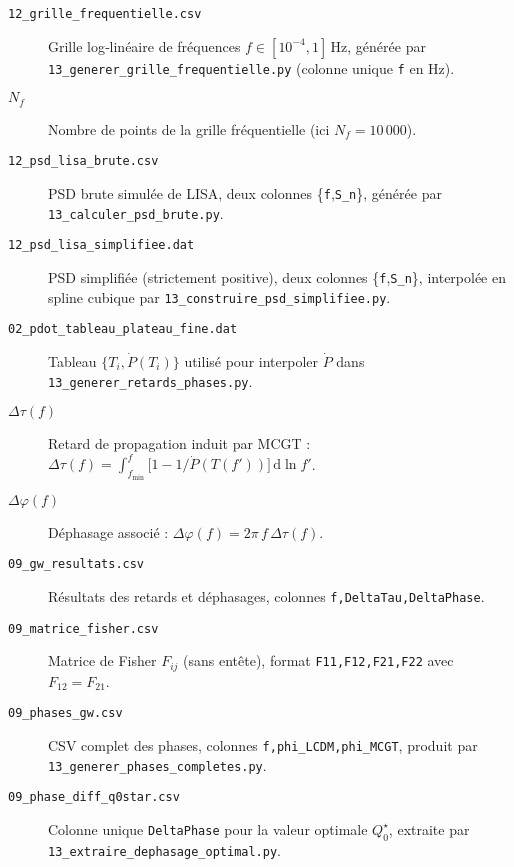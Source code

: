 \begin{description}
  \item[\texttt{12\_grille\_frequentielle.csv}]  
    Grille log‐linéaire de fréquences $f\in[10^{-4},1]\,$Hz, générée par \texttt{13\_generer\_grille\_frequentielle.py} (colonne unique \texttt{f} en Hz).

  \item[$N_{f}$]  
    Nombre de points de la grille fréquentielle (ici $N_{f}=10\,000$).

  \item[\texttt{12\_psd\_lisa\_brute.csv}]  
    PSD brute simulée de LISA, deux colonnes \{\texttt{f},\texttt{S\_n}\}, générée par \texttt{13\_calculer\_psd\_brute.py}.

  \item[\texttt{12\_psd\_lisa\_simplifiee.dat}]  
    PSD simplifiée (strictement positive), deux colonnes \{\texttt{f},\texttt{S\_n}\}, interpolée en spline cubique par \texttt{13\_construire\_psd\_simplifiee.py}.

  \item[\texttt{02\_pdot\_tableau\_plateau\_fine.dat}]  
    Tableau $\{T_i,\dot P(T_i)\}$ utilisé pour interpoler $\dot P$ dans \texttt{13\_generer\_retards\_phases.py}.

  \item[$\Delta\tau(f)$]  
    Retard de propagation induit par MCGT :  
    $\displaystyle \Delta\tau(f)
      =\int_{f_{\min}}^{f}\bigl[1 - 1/\dot P(T(f'))\bigr]\,\mathrm{d}\ln f'$.

  \item[$\Delta\varphi(f)$]  
    Déphasage associé :  
    $\Delta\varphi(f)=2\pi\,f\,\Delta\tau(f)$.

  \item[\texttt{09\_gw\_resultats.csv}]  
    Résultats des retards et déphasages, colonnes \texttt{f,DeltaTau,DeltaPhase}.

  \item[\texttt{09\_matrice\_fisher.csv}]  
    Matrice de Fisher $F_{ij}$ (sans entête), format  
    \texttt{F11,F12,F21,F22} avec $F_{12}=F_{21}$.

  \item[\texttt{09\_phases\_gw.csv}]  
    CSV complet des phases, colonnes \texttt{f,phi\_LCDM,phi\_MCGT}, produit par \texttt{13\_generer\_phases\_completes.py}.

  \item[\texttt{09\_phase\_diff\_q0star.csv}]  
    Colonne unique \texttt{DeltaPhase} pour la valeur optimale $Q_{0}^{\star}$, extraite par \texttt{13\_extraire\_dephasage\_optimal.py}.


\end{description}
